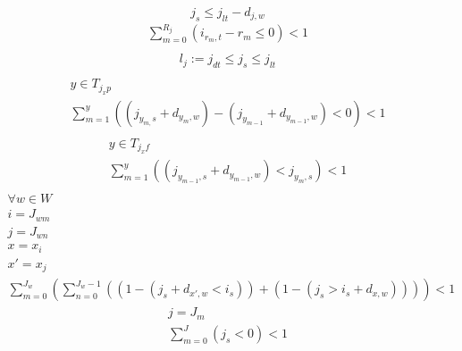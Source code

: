 \documentclass[a4paper,12pt,twoside]{scrreprt}
\begin{document}
\begin{flushleft}
	\begin{equation}
	\label{not_late}
		j_{s} \leq j_{lt} - d_{j,w}
	\end{equation}
	\begin{equation}
	\label{sufficient_resources}
		\begin{split}
			\sum_{m=0}^{R_{j}}(i_{r_{m},t}-r_{m}\leq 0) < 1\\
		\end{split}
	\end{equation}
	\begin{equation}
	\label{check_tardiness}
	\begin{split}
		l_{j} := j_{dt} \leq j_{s} \leq j_{lt} \\
	\end{split}
	\end{equation}
	\begin{equation}
	\label{no_early_start}
	\begin{split}
		y \in T_{j_{x}p} \\
		\sum_{m=1}^{y} ((j_{y_{m,}s} + d_{y_{m},w}) - (j_{y_{m - 1}} + d_{y_{m - 1},w}) < 0) < 1\\
	\end{split}
	\end{equation}
	\begin{equation}
	\label{follow_up_tasks_early_start}
	\begin{split}
		y \in T_{j_{x}f} \\
		\sum_{m=1}^{y} ((j_{y_{m - 1},s} + d_{y_{m - 1},w}) < j_{y_{m},s}) < 1\\
	\end{split}
	\end{equation}
	\begin{equation}
	\label{no_multiple_workstation_occupations}
	\begin{split}
		\forall w \in W \\
		i = J_{wm} \\
		j = J_{wn} \\
		x = x_{i} \\
		x' = x_{j} \\
		\sum_{m=0}^{J_{w}} (\sum_{n = 0}^{J_{w}-1}((1-(j_{s} + d_{x',w} < i_{s})) + (1-(j_{s} > i_{s} + d_{x,w})))) < 1
	\end{split}
	\end{equation}
	\begin{equation}
	\label{only_legal_timeslots}
	\begin{split}
	j = J_{m} \\
	\sum_{m=0}^{J} (j_{s} < 0) < 1
	\end{split}
	\end{equation}
\end{flushleft}
\end{document}
